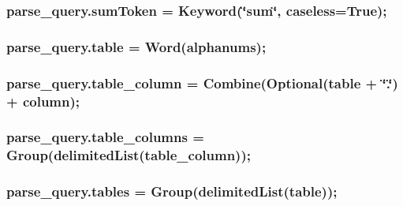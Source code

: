 \subsubsection[{\texorpdfstring{sum\+Token}{sumToken}}]{\setlength{\rightskip}{0pt plus 5cm}parse\+\_\+query.\+sum\+Token = Keyword(\char`\"{}sum\char`\"{}, caseless=True);}\hypertarget{namespaceparse__query_a8d38f4998f3935568112fcd8e31e06a3}{}\label{namespaceparse__query_a8d38f4998f3935568112fcd8e31e06a3}
\subsubsection[{\texorpdfstring{table}{table}}]{\setlength{\rightskip}{0pt plus 5cm}parse\+\_\+query.\+table = Word(alphanums);}\hypertarget{namespaceparse__query_a45fab7a8c6d7ac5d8cf43f37b4d29b7e}{}\label{namespaceparse__query_a45fab7a8c6d7ac5d8cf43f37b4d29b7e}
\subsubsection[{\texorpdfstring{table\+\_\+column}{table_column}}]{\setlength{\rightskip}{0pt plus 5cm}parse\+\_\+query.\+table\+\_\+column = Combine(Optional({\bf table} + \char`\"{}.\char`\"{}) + column);}\hypertarget{namespaceparse__query_a834dee534400bd080a0a16f06a77be78}{}\label{namespaceparse__query_a834dee534400bd080a0a16f06a77be78}
\subsubsection[{\texorpdfstring{table\+\_\+columns}{table_columns}}]{\setlength{\rightskip}{0pt plus 5cm}parse\+\_\+query.\+table\+\_\+columns = Group(delimited\+List({\bf table\+\_\+column}));}\hypertarget{namespaceparse__query_a3e5401120fbf16c839c80e55e67e215e}{}\label{namespaceparse__query_a3e5401120fbf16c839c80e55e67e215e}
\subsubsection[{\texorpdfstring{tables}{tables}}]{\setlength{\rightskip}{0pt plus 5cm}parse\+\_\+query.\+tables = Group(delimited\+List({\bf table}));}\hypertarget{namespaceparse__query_a770ec85d393de65ed54d45cf34c43f28}{}\label{namespaceparse__query_a770ec85d393de65ed54d45cf34c43f28}
